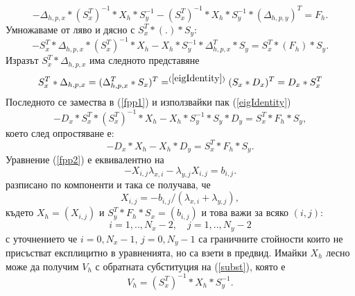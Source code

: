 \documentclass{article}
\newcommand{\be}{\begin{equation}}
\newcommand{\ee}{\end{equation}}
\newcommand{\rf}[1]{(\ref{#1})}
\begin{document}
\be
-\Delta_{h,p,x} * (S_x^T)^{-1} *X_h * S_y^{-1}  -(S_x^T)^{-1} *X_h * S_y^{-1} * (\Delta_{h,p,y})^T = F_h.
\ee
Умножаваме от ляво и дясно с $ S_x^T * ( . ) * S_y$:
\be\label{fpp1}
- S_x^T *\Delta_{h,p,x} *(S_x^T)^{-1} *X_h -X_h * S_y^{-1} * \Delta_{h,p,x}^T * S_y = S_x^T * ( F_h ) * S_y.
\ee
Изразът $S_x^T * \Delta_{h,p,x}$ има следното представяне
\be
S_x^T * \Delta_{h,p,x} = (\Delta_{h,p,x}^T * S_x)^T =^{\rf{eigIdentity}} (S_x * D_x)^T = D_x * S_x^T
\ee
Последното се замества в \rf{fpp1} и използвайки пак \rf{eigIdentity}
\be\label{fpp2}
- D_x * S_x^T *(S_x^T)^{-1} *X_h  -X_h * S_y^{-1} * S_y * D_y = S_x^T * F_h  * S_y,
\ee
което след опростяване е:
\be\label{fpp2}
- D_x * X_h -X_h * D_y = S_x^T * F_h * S_y.
\ee
Уравнение \rf{fpp2} е еквивалентно на
\be\label{fpp3}
-X_{i,j} \lambda_{x,i} - \lambda_{y,j} X_{i,j} = b_{i,j}.
\ee
разписано по компоненти и така се получава, че
\be\label{fpp4}
X_{i,j} = - b_{i,j}/(\lambda_{x,i} + \lambda_{y,j} ),
\ee
където $X_h = (X_{i,j})$ и $S_y^T * F_h  * S_x = (b_{i,j})$ и това важи за всяко $(i,j)$:
$$i = 1,..,N_x-2, \quad j = 1,..,N_y-2 $$
с уточнението че $i = 0,N_x-1$, $j = 0,N_y-1$ са граничните стойности които не присъстват експлицитно в уравненията, но са взети в предвид. Имайки $X_h$ лесно може да получим $V_h$  с обратната субституция на \rf{subst}, която е 
\be\label{substInv}
V_h = (S_x^T)^{-1} * X_h * S_y^{-1}.
\ee
\end{document}
